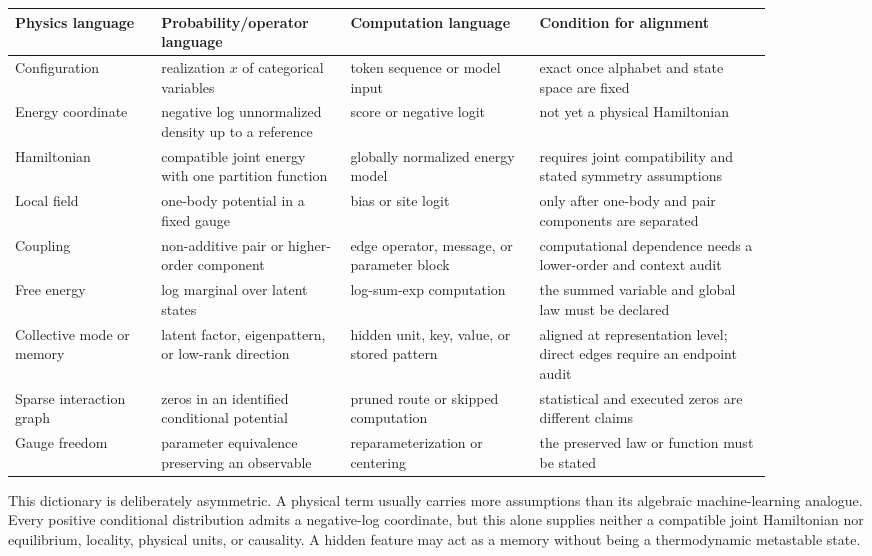 \documentclass[10pt]{article}
\theoremstyle{definition}
\theoremstyle{remark}
\begin{document}
\begin{center}
\small
\begin{tabular}{>{\raggedright\arraybackslash}p{0.17\linewidth}
                >{\raggedright\arraybackslash}p{0.22\linewidth}
                >{\raggedright\arraybackslash}p{0.22\linewidth}
                >{\raggedright\arraybackslash}p{0.27\linewidth}}
\toprule
Physics language & Probability/operator language & Computation language & Condition for alignment \\
\midrule
Configuration & realization $x$ of categorical variables & token sequence or model input & exact once alphabet and state space are fixed \\
Energy coordinate & negative log unnormalized density up to a reference & score or negative logit & not yet a physical Hamiltonian \\
Hamiltonian & compatible joint energy with one partition function & globally normalized energy model & requires joint compatibility and stated symmetry assumptions \\
Local field & one-body potential in a fixed gauge & bias or site logit & only after one-body and pair components are separated \\
Coupling & non-additive pair or higher-order component & edge operator, message, or parameter block & computational dependence needs a lower-order and context audit \\
Free energy & log marginal over latent states & log-sum-exp computation & the summed variable and global law must be declared \\
Collective mode or memory & latent factor, eigenpattern, or low-rank direction & hidden unit, key, value, or stored pattern & aligned at representation level; direct edges require an endpoint audit \\
Sparse interaction graph & zeros in an identified conditional potential & pruned route or skipped computation & statistical and executed zeros are different claims \\
Gauge freedom & parameter equivalence preserving an observable & reparameterization or centering & the preserved law or function must be stated \\
\bottomrule
\end{tabular}
\end{center}

This dictionary is deliberately asymmetric.  A physical term usually carries more assumptions
than its algebraic machine-learning analogue.  Every positive conditional distribution admits a
negative-log coordinate, but this alone supplies neither a compatible joint Hamiltonian nor
equilibrium, locality, physical units, or causality.  A hidden feature may act as a memory without
being a thermodynamic metastable state.
\end{document}

